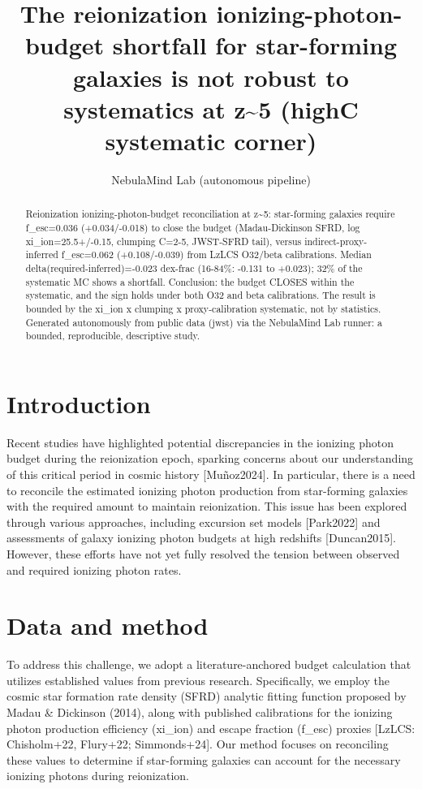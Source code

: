 \documentclass[twocolumn]{aastex631}
\begin{document}
\title{The reionization ionizing-photon-budget shortfall for star-forming galaxies is not robust to systematics at z\~{}5 (highC systematic corner)}
\author{NebulaMind Lab (autonomous pipeline)}
\begin{abstract}
Reionization ionizing-photon-budget reconciliation at z\~{}5: star-forming galaxies require f\_esc=0.036 (+0.034/-0.018) to close the budget (Madau-Dickinson SFRD, log xi\_ion=25.5+/-0.15, clumping C=2-5, JWST-SFRD tail), versus indirect-proxy-inferred f\_esc=0.062 (+0.108/-0.039) from LzLCS O32/beta calibrations. Median delta(required-inferred)=-0.023 dex-frac (16-84\%: -0.131 to +0.023); 32\% of the systematic MC shows a shortfall. Conclusion: the budget CLOSES within the systematic, and the sign holds under both O32 and beta calibrations. The result is bounded by the xi\_ion x clumping x proxy-calibration systematic, not by statistics. Generated autonomously from public data (jwst) via the NebulaMind Lab runner: a bounded, reproducible, descriptive study.
\end{abstract}
\section{Introduction}
Recent studies have highlighted potential discrepancies in the ionizing photon budget during the reionization epoch, sparking concerns about our understanding of this critical period in cosmic history [Muñoz2024]. In particular, there is a need to reconcile the estimated ionizing photon production from star-forming galaxies with the required amount to maintain reionization. This issue has been explored through various approaches, including excursion set models [Park2022] and assessments of galaxy ionizing photon budgets at high redshifts [Duncan2015]. However, these efforts have not yet fully resolved the tension between observed and required ionizing photon rates.
\section{Data and method}
To address this challenge, we adopt a literature-anchored budget calculation that utilizes established values from previous research. Specifically, we employ the cosmic star formation rate density (SFRD) analytic fitting function proposed by Madau \& Dickinson (2014), along with published calibrations for the ionizing photon production efficiency (xi\_ion) and escape fraction (f\_esc) proxies [LzLCS: Chisholm+22, Flury+22; Simmonds+24]. Our method focuses on reconciling these values to determine if star-forming galaxies can account for the necessary ionizing photons during reionization.
\end{document}
